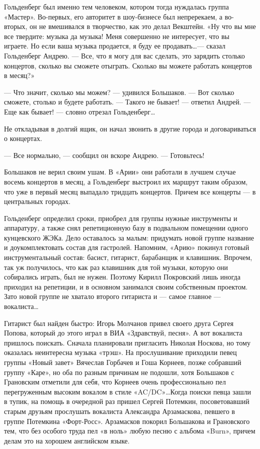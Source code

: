 \documentclass[10pt, twoside]{book}
\begin{document}
Гольденберг был именно тем человеком, котором тогда нуждалась группа «Мастер». Во-первых, его авторитет в шоу-бизнесе
был непререкаем, а во-вторых, он не вмешивался в творчество, как это делал Векштейн. «Ну что вы мне все твердите: музыка
да музыка! Меня совершенно не интересует, что вы играете. Но если ваша музыка продается, я буду ее продавать\ldots —
сказал Гольденберг Андрею. — Все, что я могу для вас сделать, это зарядить столько концертов, сколько вы сможете
отыграть. Сколько вы можете работать концертов в месяц?»

— Что значит, сколько мы можем? — удивился Большаков.
— Вот сколько сможете, столько и будете работать.
— Такого не бывает! — ответил Андрей.
— Еще как бывает! — словно отрезал Гольденберг\ldots

Не откладывая в долгий ящик, он начал звонить в другие города и договариваться о концертах.

— Все нормально, — сообщил он вскоре Андрею. — Готовьтесь!

Большаков не верил своим ушам. В «Арии» они работали в лучшем случае восемь концертов в месяц, а Гольденберг выстроил их
маршрут таким образом, что уже в первый месяц выпадало тридцать концертов. Причем все концерты — в центральных городах.

Гольденберг определил сроки, приобрел для группы нужные инструменты и аппаратуру, а также снял репетиционную базу в
подвальном помещении одного кунцевского ЖЭКа. Дело оставалось за малым: придумать новой группе название и
доукомплектовать состав для гастролей. Напомним, «Арию» покинул готовый инструментальный состав: басист, гитарист,
барабанщик и клавишник. Впрочем, так уж получилось, что как раз клавишник для той музыки, которую они собирались играть,
был не нужен. Поэтому Кирилл Покровский лишь иногда приходил на репетиции, и в основном занимался своим собственным
проектом. Зато новой группе не хватало второго гитариста и — самое главное — вокалиста\ldots

Гитарист был найден быстро: Игорь Молчанов привел своего друга Сергея Попова, который до этого играл в ВИА «Здравствуй,
песня». А вот вокалиста пришлось поискать. Сначала планировали пригласить Николая Носкова, но тому оказалась неинтересна
музыка «трэш». На прослушивание приходили певец группы «Новый завет» Вячеслав Горбачев и Гоша Корнеев, позже собравший
группу «Каре», но оба по разным причинам не подошли, хотя Большаков с Грановским отметили для себя, что Корнеев очень
профессионально пел перегруженным высоким вокалом в стиле «AC/DC»\ldots Когда поиски певца зашли в тупик, на помощь в
очередной раз пришел Сергей Потемкин, посоветовавший старым друзьям прослушать вокалиста Александра Арзамаскова, певшего
в группе Потемкина «Форт-Росс». Арзамасков покорил Большакова и Грановского тем, что без особого труда пел «в ноль»
любую песню с альбома «Burn», причем делам это на хорошем английском языке.
\end{document}
